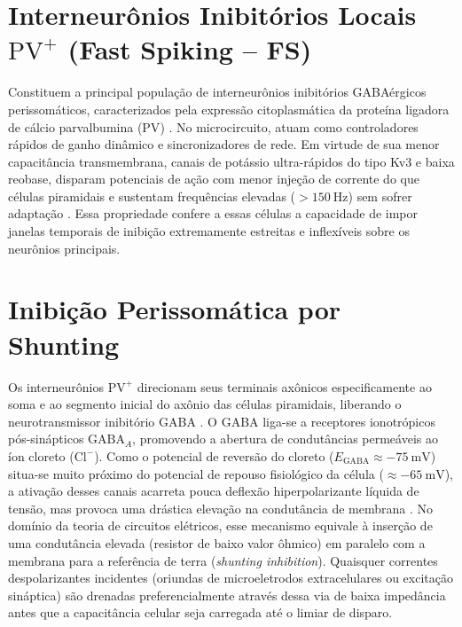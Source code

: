 \documentclass[12pt,openright,oneside,a4paper,brazil]{abntex2}
\begin{document}
\begin{apendicesenv}
    \section{Interneurônios Inibitórios Locais \texorpdfstring{$\text{PV}^+$}{PV+} (Fast Spiking -- FS)}
    Constituem a principal população de interneurônios inibitórios GABAérgicos perissomáticos, caracterizados pela expressão citoplasmática da proteína ligadora de cálcio parvalbumina ($\text{PV}$) \cite{buzsaki2006, kandel2021}. No microcircuito, atuam como controladores rápidos de ganho dinâmico e sincronizadores de rede. Em virtude de sua menor capacitância transmembrana, canais de potássio ultra-rápidos do tipo Kv3 e baixa reobase, disparam potenciais de ação com menor injeção de corrente do que células piramidais e sustentam frequências elevadas ($> \qty{150}{\hertz}$) sem sofrer adaptação \cite{izhikevich2003, izhikevich2007}. Essa propriedade confere a essas células a capacidade de impor janelas temporais de inibição extremamente estreitas e inflexíveis sobre os neurônios principais.

    \section{Inibição Perissomática por Shunting}
    Os interneurônios $\text{PV}^+$ direcionam seus terminais axônicos especificamente ao soma e ao segmento inicial do axônio das células piramidais, liberando o neurotransmissor inibitório GABA \cite{buzsaki2006, kandel2021}. O GABA liga-se a receptores ionotrópicos pós-sinápticos $\text{GABA}_A$, promovendo a abertura de condutâncias permeáveis ao íon cloreto ($\text{Cl}^-$). Como o potencial de reversão do cloreto ($E_{\text{GABA}} \approx \qty{-75}{\milli\volt}$) situa-se muito próximo do potencial de repouso fisiológico da célula ($\approx \qty{-65}{\milli\volt}$), a ativação desses canais acarreta pouca deflexão hiperpolarizante líquida de tensão, mas provoca uma drástica elevação na condutância de membrana \cite{dayan2001, gerstner2014}. No domínio da teoria de circuitos elétricos, esse mecanismo equivale à inserção de uma condutância elevada (resistor de baixo valor ôhmico) em paralelo com a membrana para a referência de terra (\emph{shunting inhibition}). Quaisquer correntes despolarizantes incidentes (oriundas de microeletrodos extracelulares ou excitação sináptica) são drenadas preferencialmente através dessa via de baixa impedância antes que a capacitância celular seja carregada até o limiar de disparo.


\end{apendicesenv}
\end{document}
